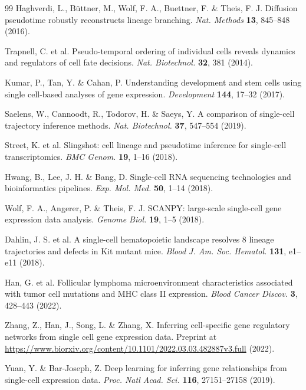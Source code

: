 \begin{singlespace}
\begin{thebibliography}{99\kern\bibindent}
Haghverdi, L., Büttner, M., Wolf, F. A., Buettner, F. \& Theis, F. J.
Diffusion pseudotime robustly reconstructs lineage branching. \textit{Nat. Methods} \textbf{13}, 845–848 (2016).

Trapnell, C. et al. Pseudo-temporal ordering of individual cells
reveals dynamics and regulators of cell fate decisions. \textit{Nat. Biotechnol.} \textbf{32}, 381 (2014).

Kumar, P., Tan, Y. \& Cahan, P. Understanding development and
stem cells using single cell-based analyses of gene expression.
\textit{Development} \textbf{144}, 17–32 (2017).

Saelens, W., Cannoodt, R., Todorov, H. \& Saeys, Y. A comparison of
single-cell trajectory inference methods. \textit{Nat. Biotechnol.} \textbf{37}, 547–554 (2019).

Street, K. et al. Slingshot: cell lineage and pseudotime inference for
single-cell transcriptomics. \textit{BMC Genom.} \textbf{19}, 1–16 (2018).

Hwang, B., Lee, J. H. \& Bang, D. Single-cell RNA sequencing technologies and bioinformatics pipelines. \textit{Exp. Mol. Med.} \textbf{50}, 1–14 (2018).

Wolf, F. A., Angerer, P. \& Theis, F. J. SCANPY: large-scale single-cell
gene expression data analysis. \textit{Genome Biol.} \textbf{19}, 1–5 (2018).

Dahlin, J. S. et al. A single-cell hematopoietic landscape resolves 8
lineage trajectories and defects in Kit mutant mice. \textit{Blood J. Am.
Soc. Hematol.} \textbf{131}, e1–e11 (2018).

Han, G. et al. Follicular lymphoma microenvironment characteristics associated with tumor cell mutations and MHC class II
expression. \textit{Blood Cancer Discov.} \textbf{3}, 428–443 (2022).

Zhang, Z., Han, J., Song, L. \& Zhang, X. Inferring cell-specific gene
regulatory networks from single cell gene expression data. Preprint
at \href{https://www.biorxiv.org/content/10.1101/2022.03.03.482887v3.full}{https://www.biorxiv.org/content/10.1101/2022.03.03.482887v3.full} (2022).

Yuan, Y. \& Bar-Joseph, Z. Deep learning for inferring gene relationships from single-cell expression data. \textit{Proc. Natl Acad. Sci.} \textbf{116}, 27151–27158 (2019).


\end{thebibliography}
\end{singlespace}
